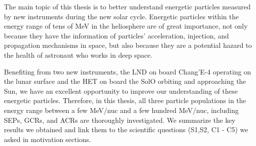

The main topic of this thesis is to better understand energetic particles measured by new instruments during the new solar cycle. 
Energetic particles within the energy range of tens of MeV in the heliosphere are of great importance, not only because they have the information of particles' acceleration, injection, and propagation mechanisms in space, but also because they are a potential hazard to the health of astronaut who works in deep space. 

Benefiting from two new instruments, the \ac{LND} on board Chang'E-4 operating on the lunar surface and the \ac{HET} on board the \ac{SolO} orbiting and approaching the Sun, we have an excellent opportunity to improve our understanding of these energetic particles.
Therefore, in this thesis, all three particle populations in the energy range between a few MeV/nuc and a few hundred MeV/nuc, including \acp{SEP}, \acp{GCR}, and \acp{ACR} are thoroughly investigated. We summarize the key results we obtained and link them to the scientific questions (S1,S2, C1 - C5) we asked in motivation sections.


